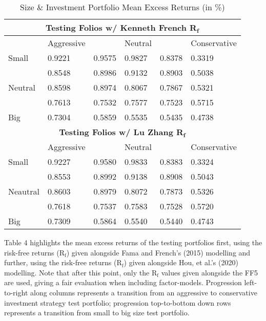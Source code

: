 \documentclass[11pt, english]{article}
\begin{document}
\begin{table}[h]
	\scriptsize
	\renewcommand{\arraystretch}{1.25}
\begin{center}
\begin{tabular}{ p{1.5cm} | p{1.5cm} p{1.5cm} p{1.5cm} p{1.5cm} p{1.5cm} }
        \hline
        \hline
        \multicolumn{6}{c}{\textbf{Testing Folios w/ Kenneth French R$\mathbf{_f}$}}\\
        \hline
        \hline
        & Aggressive & & Neutral & & Conservative\\
        \hline
        Small & 0.9221 & 0.9575 & 0.9827 & 0.8378 & 0.3319\\
        & 0.8548 & 0.8986 & 0.9132 & 0.8903 & 0.5038\\
        Neutral & 0.8598 & 0.8974 & 0.8067 & 0.7867 & 0.5321\\
        & 0.7613 & 0.7532 & 0.7577 & 0.7523 & 0.5715\\
        Big & 0.7304 & 0.5859 & 0.5535 & 0.5435 & 0.4738\\
        \hline
        \hline
        \multicolumn{6}{c}{\textbf{Testing Folios w/ Lu Zhang R$\mathbf{_f}$}}\\
        \hline
        \hline
        & Aggressive & & Neutral & & Conservative\\
        \hline
        Small & 0.9227 & 0.9580 & 0.9833 & 0.8383 & 0.3324\\
        & 0.8553 & 0.8992 & 0.9138 & 0.8908 & 0.5043\\
        Neautral & 0.8603 & 0.8979 & 0.8072 & 0.7873 & 0.5326\\
        & 0.7618 & 0.7537 & 0.7583 & 0.7528 & 0.5720\\
        Big & 0.7309 & 0.5864 & 0.5540 & 0.5440 & 0.4743\\
        \hline
\end{tabular}
        \caption{Size \& Investment Portfolio Mean Excess Returns (in \%)}
\end{center}
\end{table}

Table 4 highlights the mean excess returns of the testing portfolios first, using the risk-free returns (R$\mathrm{_f}$) given alongside Fama and French's (2015) modelling and further, using the risk-free returns (R$\mathrm{_f}$) given alongside Hou, et al.'s (2020) modelling. Note that after this point, only the R$\mathrm{_f}$ values given alongside the FF5 are used, giving a fair evaluation when including factor-models. Progression left-to-right along columns represents a transition from an aggressive to conservative investment strategy test portfolio; progression top-to-bottom down rows represents a transition from small to big size test portfolio.
\end{document}
